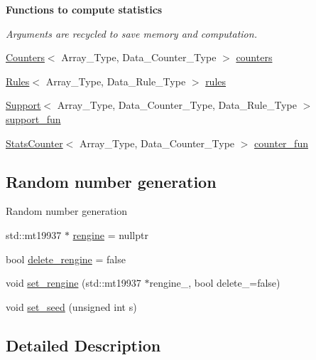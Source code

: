 \begin{Indent}\textbf{ Functions to compute statistics}\par
{\em Arguments are recycled to save memory and computation. }\begin{DoxyCompactItemize}
\item 
\hyperlink{classbarry_1_1_counters}{Counters}$<$ Array\+\_\+\+Type, Data\+\_\+\+Counter\+\_\+\+Type $>$ \hyperlink{classbarry_1_1_model_aea013a7ac325ece7564e8ea9cdf441a2}{counters}
\item 
\hyperlink{classbarry_1_1_rules}{Rules}$<$ Array\+\_\+\+Type, Data\+\_\+\+Rule\+\_\+\+Type $>$ \hyperlink{classbarry_1_1_model_a53e5242ce0ed2bc7194a0662d09493f2}{rules}
\item 
\hyperlink{classbarry_1_1_support}{Support}$<$ Array\+\_\+\+Type, Data\+\_\+\+Counter\+\_\+\+Type, Data\+\_\+\+Rule\+\_\+\+Type $>$ \hyperlink{classbarry_1_1_model_afd005aae0fdd12a8c68d1fd8823b3727}{support\+\_\+fun}
\item 
\hyperlink{classbarry_1_1_stats_counter}{Stats\+Counter}$<$ Array\+\_\+\+Type, Data\+\_\+\+Counter\+\_\+\+Type $>$ \hyperlink{classbarry_1_1_model_ada40ca4ec8b21a3dbbe646edbfb1df45}{counter\+\_\+fun}
\end{DoxyCompactItemize}
\end{Indent}
\subsection*{Random number generation}
\label{_amgrp9e5d9cca94c03e04e66d088f8628d19b}%
Random number generation \begin{DoxyCompactItemize}
\item 
std\+::mt19937 $\ast$ \hyperlink{classbarry_1_1_model_adc85f6765d272293333a83bc2a4e90d2}{rengine} = nullptr
\item 
bool \hyperlink{classbarry_1_1_model_aa408b3be05b44d4fac590a776822efdd}{delete\+\_\+rengine} = false
\item 
void \hyperlink{classbarry_1_1_model_a1e1cdb67d12968394dbd68dad0cff208}{set\+\_\+rengine} (std\+::mt19937 $\ast$rengine\+\_\+, bool delete\+\_\+=false)
\item 
void \hyperlink{classbarry_1_1_model_a175a1772d843dedd603f6bb572cfa30a}{set\+\_\+seed} (unsigned int s)
\end{DoxyCompactItemize}


\subsection{Detailed Description}
